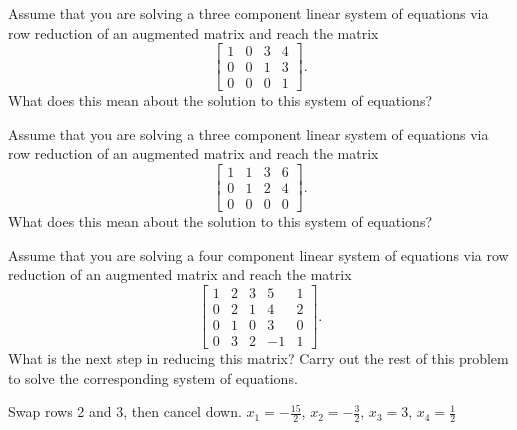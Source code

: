 \begin{exercise}\ansMark%
Assume that you are solving a three component linear system of equations via row reduction of an augmented matrix and reach the matrix
\begin{equation*}
\left[ 
\begin{array}{ccc|c}
1 & 0 & 3 & 4 \\
0 & 0 & 1 & 3 \\
0 & 0 & 0 & 1
\end{array}
\right].
\end{equation*}
What does this mean about the solution to this system of equations?
\end{exercise}

\begin{exercise}\ansMark%
Assume that you are solving a three component linear system of equations via row reduction of an augmented matrix and reach the matrix
\begin{equation*}
\left[ 
\begin{array}{ccc|c}
1 & 1 & 3 & 6 \\
0 & 1 & 2 & 4 \\
0 & 0 & 0 & 0
\end{array}
\right].
\end{equation*}
What does this mean about the solution to this system of equations?
\end{exercise}

\begin{exercise}
Assume that you are solving a four component linear system of equations via row reduction of an augmented matrix and reach the matrix
\begin{equation*}
\left[ 
\begin{array}{cccc|c}
1 & 2 & 3 & 5 & 1 \\
0 & 2 & 1 & 4 & 2 \\
0 & 1 & 0 & 3 & 0 \\
0 & 3 & 2 & -1 & 1
\end{array}
\right].
\end{equation*}
What is the next step in reducing this matrix? Carry out the rest of this problem to solve the corresponding system of equations. 
\end{exercise}
\comboSol{%
}
{%
Swap rows 2 and 3, then cancel down. $x_1 = -\frac{15}{2}$, $x_2 = -\frac{3}{2}$, $x_3 = 3$, $x_4 = \frac{1}{2}$
}


